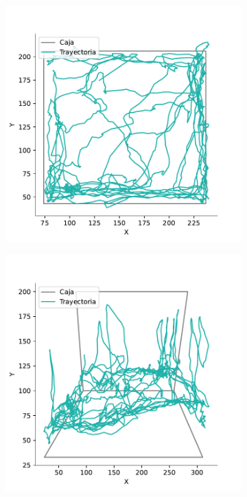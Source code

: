 \begin{figure}[p]
\begin{subfigure}{0.38\textwidth}
    \caption{}
    \label{fig:filter-lat}
  \end{subfigure}
  \begin{subfigure}{0.38\textwidth}
    \centering
    \includegraphics[width=\textwidth]{figures/interpolated-trayectory-top-4128-2020-12-02.pdf}
    \caption{}
    \label{fig:inter-top}
  \end{subfigure}
  \begin{subfigure}{0.38\textwidth}
    \centering
    \includegraphics[width=\textwidth]{figures/interpolated-trayectory-lateral-4128-2020-12-02.pdf}

\end{subfigure}
\end{figure}
